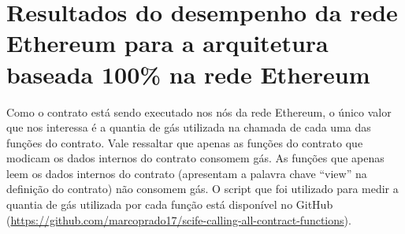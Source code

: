 \section{Resultados do desempenho da rede Ethereum para a arquitetura baseada 100\% na rede Ethereum}

Como o contrato está sendo executado nos nós da rede Ethereum, o único valor que nos interessa é a quantia de gás utilizada na chamada de cada uma das funções do contrato. Vale ressaltar que apenas as funções do contrato que modicam os dados internos do contrato consomem gás. As funções que apenas leem os dados internos do contrato (apresentam a palavra chave ``view'' na definição do contrato) não consomem gás. O script que foi utilizado para medir a quantia de gás utilizada por cada função está disponível no GitHub (\href{https://github.com/marcoprado17/scife-calling-all-contract-functions}{https://github.com/marcoprado17/scife-calling-all-contract-functions}).

